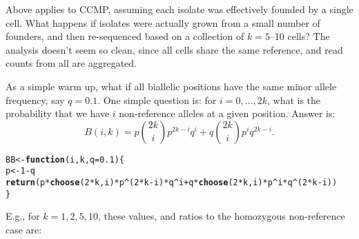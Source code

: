 \documentclass{article}\usepackage[]{graphicx}\usepackage[]{color}
\makeatletter
\newcommand{\hlnum}[1]{\textcolor[rgb]{0.686,0.059,0.569}{#1}}%
\newcommand{\hlopt}[1]{\textcolor[rgb]{0,0,0}{#1}}%
\newcommand{\hlstd}[1]{\textcolor[rgb]{0.345,0.345,0.345}{#1}}%
\newcommand{\hlkwa}[1]{\textcolor[rgb]{0.161,0.373,0.58}{\textbf{#1}}}%
\newcommand{\hlkwb}[1]{\textcolor[rgb]{0.69,0.353,0.396}{#1}}%
\newcommand{\hlkwc}[1]{\textcolor[rgb]{0.333,0.667,0.333}{#1}}%
\newcommand{\hlkwd}[1]{\textcolor[rgb]{0.737,0.353,0.396}{\textbf{#1}}}%
\newenvironment{kframe}{%
 \def\at@end@of@kframe{}%
 \ifinner\ifhmode%
  \def\at@end@of@kframe{\end{minipage}}%
  \begin{minipage}{\columnwidth}%
 \fi\fi%
 \def\FrameCommand##1{\hskip\@totalleftmargin \hskip-\fboxsep
 \colorbox{shadecolor}{##1}\hskip-\fboxsep
     \hskip-\linewidth \hskip-\@totalleftmargin \hskip\columnwidth}%
 \MakeFramed {\advance\hsize-\width
   \@totalleftmargin\z@ \linewidth\hsize
   \@setminipage}}%
 {\par\unskip\endMakeFramed%
 \at@end@of@kframe}
\newenvironment{knitrout}{}{} %
\makeatother
\begin{document}
Above applies to CCMP, assuming each isolate was effectively founded by a single cell.  What happens if isolates were actually grown from a small number of founders, and then re-sequenced based on a collection of $k=5$--10 cells?  The analysis doesn't seem so clean, since all cells share the same reference, and read counts from all are aggregated.

As a simple warm up, what if all biallelic positions have the same minor allele frequency, say $q=0.1$.  One simple question is: for $i = 0, \ldots, 2k$, what is the probability that we have $i$ non-reference alleles at a given position.  Answer is:
$$
  B(i,k) = p {{2k}\choose{i}} p^{2k-i} q^i + q {{2k}\choose{i}} p^i q^{2k-i} .
$$

\begin{knitrout}\footnotesize
{}\color{fgcolor}\begin{kframe}
\begin{alltt}
\hlstd{BB} \hlkwb{<-} \hlkwa{function}\hlstd{(}\hlkwc{i}\hlstd{,}\hlkwc{k}\hlstd{,}\hlkwc{q}\hlstd{=}\hlnum{0.1}\hlstd{)\{}
  \hlstd{p} \hlkwb{<-} \hlnum{1}\hlopt{-}\hlstd{q}
  \hlkwd{return}\hlstd{(p} \hlopt{*} \hlkwd{choose}\hlstd{(}\hlnum{2}\hlopt{*}\hlstd{k, i)} \hlopt{*} \hlstd{p}\hlopt{^}\hlstd{(}\hlnum{2}\hlopt{*}\hlstd{k}\hlopt{-}\hlstd{i)} \hlopt{*} \hlstd{q}\hlopt{^}\hlstd{i} \hlopt{+} \hlstd{q} \hlopt{*} \hlkwd{choose}\hlstd{(}\hlnum{2}\hlopt{*}\hlstd{k, i)} \hlopt{*} \hlstd{p}\hlopt{^}\hlstd{i} \hlopt{*} \hlstd{q}\hlopt{^}\hlstd{(}\hlnum{2}\hlopt{*}\hlstd{k}\hlopt{-}\hlstd{i))}
\hlstd{\}}
\end{alltt}
\end{kframe}
\end{knitrout}

E.g., for $k=1, 2, 5, 10$, these values, and ratios to the homozygous non-reference case are:
\end{document}

